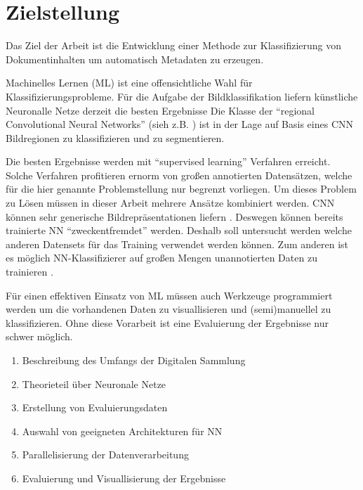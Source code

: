\documentclass[nohyper,nobib]{tufte-handout}
\begin{document}
\section{Zielstellung}
Das Ziel der Arbeit ist die Entwicklung einer Methode zur Klassifizierung von Dokumentinhalten um automatisch Metadaten zu erzeugen. 

Machinelles Lernen (ML) ist eine offensichtliche Wahl für Klassifizierungsprobleme. Für die Aufgabe der Bildklassifikation liefern künstliche Neuronalle Netze derzeit die besten Ergebnisse\cite{rodrigo_benenson_classification_2016}
Die Klasse der ``regional Convolutional Neural Networks'' (sieh z.B. \cite{girshick_region-based_2016}) ist in der Lage auf Basis eines CNN Bildregionen zu klassifizieren und zu segmentieren. 

Die besten Ergebnisse werden mit ``supervised learning'' Verfahren erreicht. 
Solche Verfahren profitieren ernorm von großen annotierten Datensätzen, welche 
für die hier genannte Problemstellung nur begrenzt vorliegen.
Um dieses Problem zu Lösen müssen in dieser Arbeit mehrere Ansätze kombiniert werden.
CNN können  sehr generische Bildrepräsentationen liefern \cite{razavian_cnn_2014}. 
Deswegen können bereits trainierte NN ``zweckentfremdet'' werden. Deshalb soll untersucht werden welche anderen Datensets für das Training verwendet werden können. 
Zum anderen ist es möglich NN-Klassifizierer auf großen Mengen unannotierten Daten zu trainieren \cite{le_building_2013}.



Für einen effektiven Einsatz von ML müssen auch Werkzeuge programmiert werden um die vorhandenen Daten zu visuallisieren 
und (semi)manuellel zu klassifizieren. 
Ohne diese Vorarbeit ist eine Evaluierung der Ergebnisse nur schwer möglich. 




\begin{enumerate}
	\item Beschreibung des Umfangs der Digitalen Sammlung
	\item Theorieteil über Neuronale Netze 
	\item Erstellung von Evaluierungsdaten
	\item Auswahl von geeigneten Architekturen für NN
	\item Parallelisierung der Datenverarbeitung
	\item Evaluierung und Visuallisierung der Ergebnisse
\end{enumerate}

% 
\printbibliography{}
\end{document}
